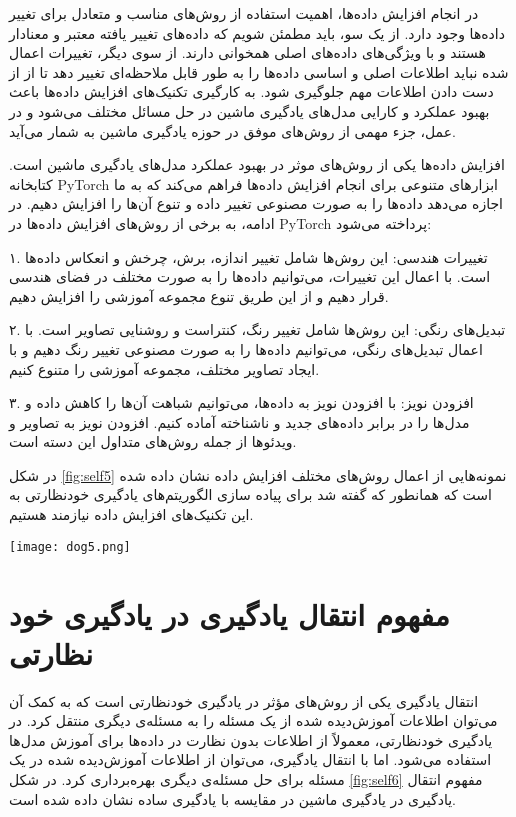 در انجام افزایش داده‌ها، اهمیت استفاده از روش‌های مناسب و متعادل برای تغییر داده‌ها وجود دارد. از یک سو، باید مطمئن شویم که داده‌های تغییر یافته معتبر و معنادار هستند و با ویژگی‌های داده‌های اصلی همخوانی دارند. از سوی دیگر، تغییرات اعمال شده نباید اطلاعات اصلی و اساسی داده‌ها را به طور قابل ملاحظه‌ای تغییر دهد تا از از دست دادن اطلاعات مهم جلوگیری شود. به کارگیری تکنیک‌های افزایش داده‌ها باعث بهبود عملکرد و کارایی مدل‌های یادگیری ماشین در حل مسائل مختلف می‌شود و در عمل، جزء مهمی از روش‌های موفق در حوزه یادگیری ماشین به شمار می‌آید.

افزایش داده‌ها  یکی از روش‌های موثر در بهبود عملکرد مدل‌های یادگیری ماشین است. کتابخانه PyTorch ابزارهای متنوعی برای انجام افزایش داده‌ها فراهم می‌کند که به ما اجازه می‌دهد داده‌ها را به صورت مصنوعی تغییر داده و تنوع آن‌ها را افزایش دهیم. در ادامه، به برخی از روش‌های افزایش داده‌ها در PyTorch پرداخته می‌شود:

۱. تغییرات هندسی: این روش‌ها شامل تغییر اندازه، برش، چرخش و انعکاس داده‌ها است. با اعمال این تغییرات، می‌توانیم داده‌ها را به صورت مختلف در فضای هندسی قرار دهیم و از این طریق تنوع مجموعه آموزشی را افزایش دهیم.

۲. تبدیل‌های رنگی: این روش‌ها شامل تغییر رنگ، کنتراست و روشنایی تصاویر است. با اعمال تبدیل‌های رنگی، می‌توانیم داده‌ها را به صورت مصنوعی تغییر رنگ دهیم و با ایجاد تصاویر مختلف، مجموعه آموزشی را متنوع‌ کنیم.

۳. افزودن نویز: با افزودن نویز به داده‌ها، می‌توانیم شباهت آن‌ها را کاهش داده و مدل‌ها را در برابر داده‌های جدید و ناشناخته آماده کنیم. افزودن نویز به تصاویر و ویدئوها از جمله روش‌های متداول این دسته است.


در شکل \ref{fig:self5} نمونه‌هایی از اعمال روش‌های مختلف افزایش داده نشان داده شده است که همانطور که گفته شد برای پیاده سازی الگوریتم‌های یادگیری خودنظارتی به این تکنیک‌های افزایش  داده نیازمند هستیم.

\begin{minipage}{\linewidth}
	\centering
	\texttt{[image: dog5.png]}
	\captionsetup{font=small} %
	\label{fig:self5}
\end{minipage}


\section{مفهوم انتقال یادگیری در یادگیری خود نظارتی}

انتقال یادگیری  یکی از روش‌های مؤثر در یادگیری خودنظارتی است که به کمک آن می‌توان اطلاعات آموزش‌دیده شده از یک مسئله را به مسئله‌ی دیگری منتقل کرد. در یادگیری خودنظارتی، معمولاً از اطلاعات بدون نظارت در داده‌ها برای آموزش مدل‌ها استفاده می‌شود. اما با انتقال یادگیری، می‌توان از اطلاعات آموزش‌دیده شده در یک مسئله برای حل مسئله‌ی دیگری بهره‌برداری کرد. در شکل \ref{fig:self6} مفهوم انتقال یادگیری در یادگیری ماشین در مقایسه با یادگیری ساده نشان داده شده است.

